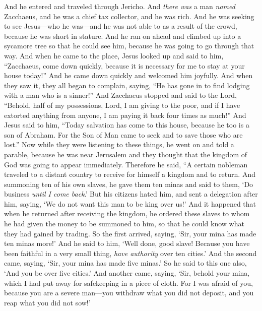 \begin{biblechapter} %
 And he entered and traveled through Jericho.
\verse And \textit{there was} a man \textit{named} Zacchaeus, and he was a chief tax collector, and he was rich.
\verse And he was seeking to see Jesus—who he was—and he was not able to as a result of the crowd, because he was short in stature.
\verse And he ran on ahead and climbed up into a sycamore tree so that he could see him, because he was going to go through that way.
\verse And when he came to the place, Jesus looked up and said to him, “Zacchaeus, come down quickly, because it is necessary for me to stay at your house today!”
\verse And he came down quickly and welcomed him joyfully.
\verse And when they saw it, they all began to complain, saying, “He has gone in to find lodging with a man who is a sinner!”
\verse And Zacchaeus stopped and said to the Lord, “Behold, half of my possessions, Lord, I am giving to the poor, and if I have extorted anything from anyone, I am paying it back four times as much!”
\verse And Jesus said to him, “Today salvation has come to this house, because he too is a son of Abraham.
\verse For the Son of Man came to seek and to save those who are lost.”
 Now while they were listening to these things, he went on and told a parable, because he was near Jerusalem and they thought that the kingdom of God was going to appear immediately.
\verse Therefore he said, “A certain nobleman traveled to a distant country to receive for himself a kingdom and to return.
\verse And summoning ten of his own slaves, he gave them ten minas and said to them, ‘Do business \textit{until I come back}.’
\verse But his citizens hated him, and sent a delegation after him, saying, ‘We do not want this man to be king over us!’
\verse And it happened that when he returned after receiving the kingdom, he ordered these slaves to whom he had given the money to be summoned to him, so that he could know what they had gained by trading.
\verse So the first arrived, saying, ‘Sir, your mina has made ten minas more!’
\verse And he said to him, ‘Well done, good slave! Because you have been faithful in a very small thing, \textit{have authority} over ten cities.’
\verse And the second came, saying, ‘Sir, your mina has made five minas.’
\verse So he said to this one also, ‘And you be over five cities.’
\verse And another came, saying, ‘Sir, behold your mina, which I had put away for safekeeping in a piece of cloth.
\verse For I was afraid of you, because you are a severe man—you withdraw what you did not deposit, and you reap what you did not sow!’

\end{biblechapter}
